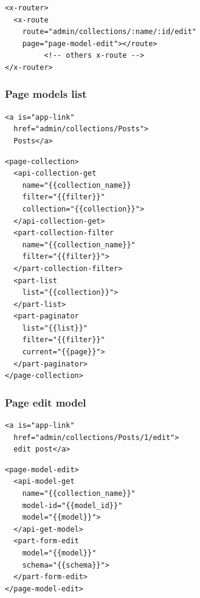 \documentclass{sig-alternate}
\begin{document}
\begin{lstlisting}[language=HTML5, label={lst:add-a-label-here}, captionpos=b,  caption=Add a caption here.]
<x-router>
  <x-route 
    route="admin/collections/:name/:id/edit" 
    page="page-model-edit"></route>
         <!-- others x-route -->
</x-router>
\end{lstlisting}







\subsubsection{Page models list}


\begin{lstlisting}[language=HTML5, label={lst:add-a-label-here}, captionpos=b,  caption=Add a caption here.]
<a is="app-link" 
  href="admin/collections/Posts">
  Posts</a>
\end{lstlisting}


\begin{lstlisting}[language=HTML5, label={lst:add-a-label-here-n2}, captionpos=b,  caption=model list page.]
<page-collection>
  <api-collection-get 
    name="{{collection_name}} 
    filter="{{filter}}"
    collection="{{collection}}">
  </api-collection-get>
  <part-collection-filter 
    name="{{collection_name}}"  
    filter="{{filter}}">
  </part-collection-filter>
  <part-list 
    list="{{collection}}">
  </part-list>
  <part-paginator 
    list="{{list}}" 
    filter="{{filter}}"
    current="{{page}}">
  </part-paginator>
</page-collection>
\end{lstlisting}



\subsubsection{Page edit model}
\begin{lstlisting}[language=HTML5, label={lst:add-a-label-here}, captionpos=b,  caption=Add a caption here.]
<a is="app-link" 
  href="admin/collections/Posts/1/edit">
  edit post</a>
\end{lstlisting}


\begin{lstlisting}[language=HTML5, label={lst:add-a-label-here-n2}, captionpos=b,  caption=model edit page.]
<page-model-edit>
  <api-model-get 
    name="{{collection_name}}" 
    model-id="{{model_id}}"
    model="{{model}}">
  </api-get-model>
  <part-form-edit 
    model="{{model}}" 
    schema="{{schema}}">
  </part-form-edit>
</page-model-edit>
\end{lstlisting}
\end{document}
